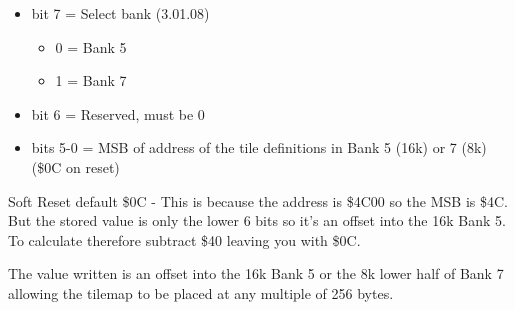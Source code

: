 \begin{itemize}
\item bit 7 = Select bank (3.01.08)
\begin{itemize}
\item[] 0 = Bank 5
\item[] 1 = Bank 7
\end{itemize}
\item bit 6 = Reserved, must be 0
\item bits 5-0 = MSB of address of the tile definitions in Bank 5 (16k) or 7
(8k) (\$0C on reset)
\end{itemize}
Soft Reset default \$0C - This is because the address is \$4C00 so the
MSB is \$4C. But the stored value is only the lower 6 bits so it's an
offset into the 16k Bank 5. To calculate therefore subtract \$40
leaving you with \$0C.

The value written is an offset into the 16k Bank 5 or the 8k lower
half of Bank 7 allowing the tilemap to be placed at any multiple of
256 bytes.

